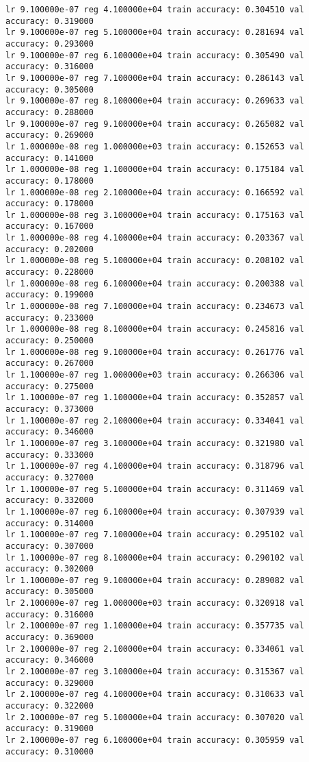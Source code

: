 \documentclass[11pt]{article}
\begin{document}
\begin{Verbatim}[commandchars=\\\{\}]
lr 9.100000e-07 reg 4.100000e+04 train accuracy: 0.304510 val accuracy: 0.319000
lr 9.100000e-07 reg 5.100000e+04 train accuracy: 0.281694 val accuracy: 0.293000
lr 9.100000e-07 reg 6.100000e+04 train accuracy: 0.305490 val accuracy: 0.316000
lr 9.100000e-07 reg 7.100000e+04 train accuracy: 0.286143 val accuracy: 0.305000
lr 9.100000e-07 reg 8.100000e+04 train accuracy: 0.269633 val accuracy: 0.288000
lr 9.100000e-07 reg 9.100000e+04 train accuracy: 0.265082 val accuracy: 0.269000
lr 1.000000e-08 reg 1.000000e+03 train accuracy: 0.152653 val accuracy: 0.141000
lr 1.000000e-08 reg 1.100000e+04 train accuracy: 0.175184 val accuracy: 0.178000
lr 1.000000e-08 reg 2.100000e+04 train accuracy: 0.166592 val accuracy: 0.178000
lr 1.000000e-08 reg 3.100000e+04 train accuracy: 0.175163 val accuracy: 0.167000
lr 1.000000e-08 reg 4.100000e+04 train accuracy: 0.203367 val accuracy: 0.202000
lr 1.000000e-08 reg 5.100000e+04 train accuracy: 0.208102 val accuracy: 0.228000
lr 1.000000e-08 reg 6.100000e+04 train accuracy: 0.200388 val accuracy: 0.199000
lr 1.000000e-08 reg 7.100000e+04 train accuracy: 0.234673 val accuracy: 0.233000
lr 1.000000e-08 reg 8.100000e+04 train accuracy: 0.245816 val accuracy: 0.250000
lr 1.000000e-08 reg 9.100000e+04 train accuracy: 0.261776 val accuracy: 0.267000
lr 1.100000e-07 reg 1.000000e+03 train accuracy: 0.266306 val accuracy: 0.275000
lr 1.100000e-07 reg 1.100000e+04 train accuracy: 0.352857 val accuracy: 0.373000
lr 1.100000e-07 reg 2.100000e+04 train accuracy: 0.334041 val accuracy: 0.346000
lr 1.100000e-07 reg 3.100000e+04 train accuracy: 0.321980 val accuracy: 0.333000
lr 1.100000e-07 reg 4.100000e+04 train accuracy: 0.318796 val accuracy: 0.327000
lr 1.100000e-07 reg 5.100000e+04 train accuracy: 0.311469 val accuracy: 0.332000
lr 1.100000e-07 reg 6.100000e+04 train accuracy: 0.307939 val accuracy: 0.314000
lr 1.100000e-07 reg 7.100000e+04 train accuracy: 0.295102 val accuracy: 0.307000
lr 1.100000e-07 reg 8.100000e+04 train accuracy: 0.290102 val accuracy: 0.302000
lr 1.100000e-07 reg 9.100000e+04 train accuracy: 0.289082 val accuracy: 0.305000
lr 2.100000e-07 reg 1.000000e+03 train accuracy: 0.320918 val accuracy: 0.316000
lr 2.100000e-07 reg 1.100000e+04 train accuracy: 0.357735 val accuracy: 0.369000
lr 2.100000e-07 reg 2.100000e+04 train accuracy: 0.334061 val accuracy: 0.346000
lr 2.100000e-07 reg 3.100000e+04 train accuracy: 0.315367 val accuracy: 0.329000
lr 2.100000e-07 reg 4.100000e+04 train accuracy: 0.310633 val accuracy: 0.322000
lr 2.100000e-07 reg 5.100000e+04 train accuracy: 0.307020 val accuracy: 0.319000
lr 2.100000e-07 reg 6.100000e+04 train accuracy: 0.305959 val accuracy: 0.310000

\end{Verbatim}
\end{document}
